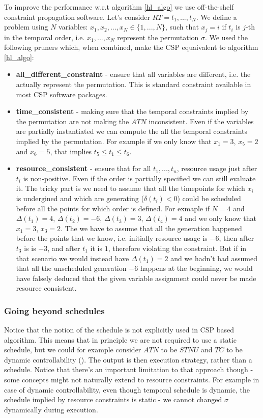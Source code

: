 To improve the performance w.r.t algorithm \ref{hl_algo} we use off-the-shelf constraint propagation software. Let's consider $RT={t_1, ..., t_N}$. We define a problem using $N$ variables:  $x_1, x_2, ..., x_N \in \{ 1, ..., N \}$, such that $x_j=i$ if $t_i$ is $j$-th in the temporal order, i.e. $x_1, ..., x_N$ represent the permutation $\sigma$. We used the following pruners which, when combined, make the CSP equaivalent to algorithm \ref{hl_algo}:
\begin{itemize}
\item \textbf{all\_different\_constraint} - ensure that all variables are different, i.e. the actually represent the permutation. This is standard constraint available in most CSP software packages.
\item \textbf{time\_consistent} - making sure that the temporal constraints implied by the permutation are not making the $ATN$ inconsistent. Even if the variables are partially instantiated we can compute the all the temporal constraints implied by the permutation. For example if we only know that $x_1 = 3$, $x_5 = 2$ and $x_6=5$, that implies $t_5 \leq t_1 \leq t_6$.
\item \textbf{resource\_consistent} - ensure that for all $t_1, ..., t_n$, resource usage just after $t_i$ is non-positive. Even if the order is partially specified we can still evaluate it. The tricky part is we need to assume that all the timepoints for which $x_i$ is undergined and which are generating ($\delta(t_i) < 0$) could be scheduled before all the points for which order is defined. For exmaple if $N = 4$ and $\Delta(t_1) = 4$, $\Delta(t_2) = -6$, $\Delta(t_3) = 3$, $\Delta(t_4) = 4$ and we only know that $x_1 = 3$, $x_3 = 2$. The we have to assume that all the generation happened before the points that we know, i.e. initially resource usage is $-6$, then after $t_3$ is is $-3$, and after $t_1$ it is $1$, therefore violating the constraint. But if in that scenario we would instead have $\Delta(t_1) = 2$ and we hadn't had assumed that all the unscheduled generation $-6$ happens at the beginning, we would have falsely deduced that the given variable assignment could never be made resource consistent.
\end{itemize}

\subsubsection{Going beyond schedules}
Notice that the notion of the schedule is not explicitly used in CSP based algorithm. This means that in principle we are not required to use a static schedule, but we could for example consider $ATN$ to be $STNU$ and $TC$ to be dynamic controllability (\cite{vidal1996dealing}). The output is then execution strategy, rather than a schedule. Notice that there's an important limitation to that approach though - some concepts might not naturally extend to resource constraints. For example in case of dynamic controllability, even though temporal schedule is dynamic, the schedule implied by resource constraints is static - we cannot changed $\sigma$ dynamically during execution.

